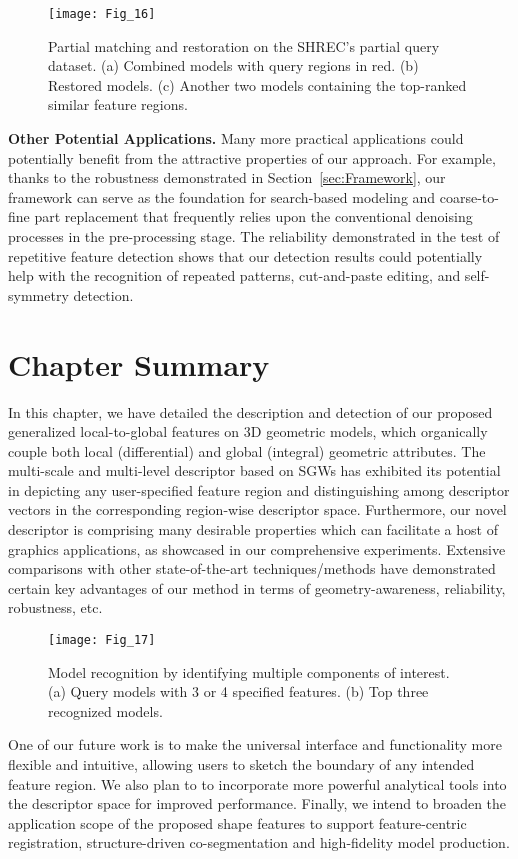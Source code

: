 \begin{figure}[!to]
\texttt{[image: Fig\_16]}
\caption[Partial shape matching and restoration.]
 {Partial matching and restoration on the SHREC's partial query
  dataset. (a) Combined models with query regions in red. (b) Restored
  models.  (c) Another two models containing the top-ranked similar
  feature regions.}
\label{partial-query}
\end{figure}

\textbf{Other Potential Applications.} Many more practical applications
could potentially benefit from the attractive properties of our
approach. For example, thanks to the robustness demonstrated in
Section~\ref{sec:Framework}, our framework can serve as the foundation
for search-based modeling and coarse-to-fine part replacement that
frequently relies upon the conventional denoising processes in the
pre-processing stage. The reliability demonstrated in the test of
repetitive feature detection shows that our detection results could
potentially help with the recognition of repeated patterns,
cut-and-paste editing, and self-symmetry detection.

\section{Chapter Summary}
\label{sec:feature:sum}

In this chapter, we have detailed the description and detection of our
proposed generalized local-to-global features on 3D geometric models,
which organically couple both local (differential) and global
(integral) geometric attributes. The multi-scale and multi-level
descriptor based on SGWs has exhibited its potential in depicting any
user-specified feature region and distinguishing among descriptor
vectors in the corresponding region-wise descriptor space.
Furthermore, our novel descriptor is comprising many desirable
properties which can facilitate a host of graphics applications, as
showcased in our comprehensive experiments. Extensive comparisons with
other state-of-the-art techniques/methods have demonstrated certain
key advantages of our method in terms of geometry-awareness,
reliability, robustness, etc.

\begin{figure}[!to]
\begin{center}
\texttt{[image: Fig\_17]}
\end{center}
\caption[Model recognition by identifying multiple components.]
 {Model recognition by identifying multiple components of
 interest. (a) Query models with 3 or 4 specified features.
  (b) Top three recognized models.}
\label{recognition}
\end{figure}

One of our future work is to make the universal interface and functionality
more flexible and intuitive, allowing users to sketch the boundary of any
intended feature region. We also plan to to incorporate more powerful
analytical tools into the descriptor space for improved performance.
Finally, we intend to broaden the application scope of the proposed shape features to support feature-centric registration, structure-driven co-segmentation
and high-fidelity model production. 